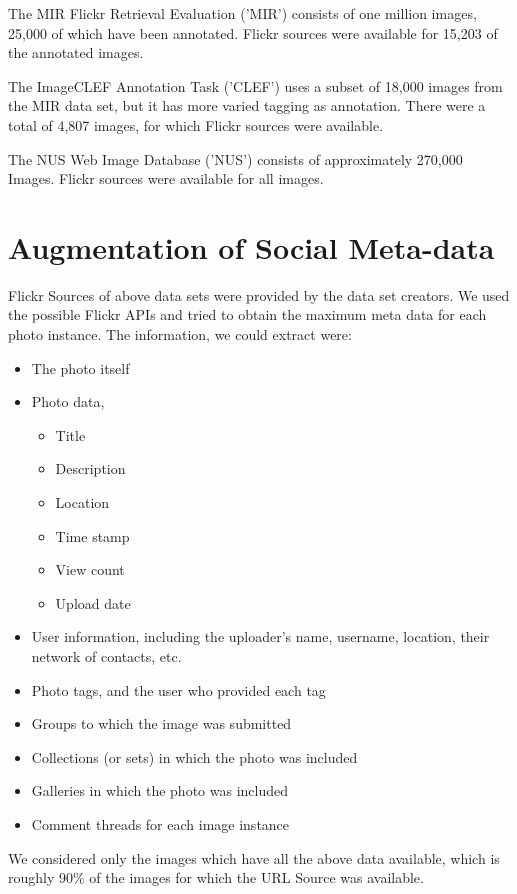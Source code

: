 The MIR Flickr Retrieval Evaluation ('MIR') consists of
one million images, 25,000 of which have been annotated. Flickr
sources were available for 15,203 of the annotated images.

The ImageCLEF Annotation Task ('CLEF') uses a subset of
18,000 images from the MIR data set, but it has more varied tagging
as annotation. There were a total of 4,807 images, for which Flickr
sources were available.

The NUS Web Image Database ('NUS') consists of
approximately 270,000 Images. Flickr sources were available for all
images.
\section{Augmentation of Social Meta-data}
Flickr Sources of above data sets were provided by the data set
creators. We used the possible Flickr APIs and tried to obtain the
maximum meta data for each photo instance. The information, we could
extract were:
\begin{itemize}
\item 	The photo itself
\item 	Photo data,
\begin{itemize}
\item Title
\item Description
\item Location
\item Time stamp
\item View count
\item Upload date
\end{itemize}
\item 	User information, including the uploader's name, username, location, their network of contacts, etc.
\item 	Photo tags, and the user who provided each tag
\item 	Groups to which the image was submitted
\item 	Collections (or sets) in which the photo was included
\item 	Galleries in which the photo was included
\item 	 Comment threads for each image instance
\end{itemize}
We considered only the images which have all the above data available,
which is roughly 90\% of the images for which the URL Source was available.
